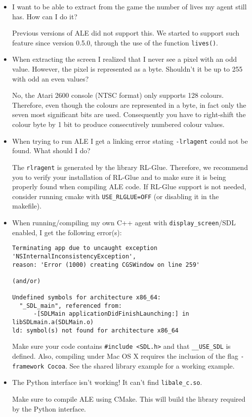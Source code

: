 \documentclass[12pt]{article}
\begin{document}
\begin{itemize}
\item I want to be able to extract from the game the number of lives my agent still has. How can I do it?

Previous versions of ALE did not support this. We started to support such feature since version 
0.5.0, through the use of the function \verb+lives()+.

\item When extracting the screen I realized that I never see a pixel with an odd value. However,
the pixel is represented as a byte. Shouldn't it be up to 255 with odd an even values?

No, the Atari 2600 console (NTSC format) only supports 128 colours. Therefore, even though the colours are represented 
in a byte, in fact only the seven most significant bits are used. Consequently you have
to right-shift the colour byte by 1 bit to produce consecutively numbered colour values.

\item When trying to run ALE I get a linking error stating \verb+-lrlagent+ could not be found.  
What should I do?

The \verb+rlragent+ is generated by the library RL-Glue. Therefore, we recommend you to verify your 
installation of RL-Glue and to make sure it is being properly found when compiling ALE code. If
RL-Glue support is not needed, consider running cmake with \verb+USE_RLGLUE=OFF+ (or disabling
it in the makefile).

\item When running/compiling my own C++ agent with \verb+display_screen+/SDL enabled, I get the following error(s):

\begin{verbatim}
Terminating app due to uncaught exception 'NSInternalInconsistencyException', 
reason: 'Error (1000) creating CGSWindow on line 259'

(and/or)

Undefined symbols for architecture x86_64:
  "_SDL_main", referenced from:
      -[SDLMain applicationDidFinishLaunching:] in libSDLmain.a(SDLMain.o)
ld: symbol(s) not found for architecture x86_64
\end{verbatim}

Make sure your code contains \verb+#include <SDL.h>+ and that \verb+__USE_SDL+ is defined. Also, compiling under Mac OS X requires the inclusion of the flag \verb+-framework Cocoa+. See the shared library example for a working example. 

\item The Python interface isn't working! It can't find \verb+libale_c.so+.

Make sure to compile ALE using CMake. This will build the library required by the Python interface. 

\end{itemize}
\end{document}
